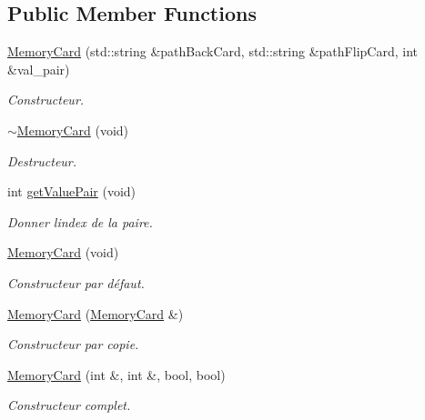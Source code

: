 \subsection*{Public Member Functions}
\begin{DoxyCompactItemize}
\item 
\hyperlink{class_memory_card_a64380fa5fec0bcd01a1907804989ca9c}{Memory\+Card} (std\+::string \&path\+Back\+Card, std\+::string \&path\+Flip\+Card, int \&val\+\_\+pair)
\begin{DoxyCompactList}\small\item\em Constructeur. \end{DoxyCompactList}\item 
\mbox{\label{class_memory_card_a3de3cef7b7af45dbf250435fb5004223}} 
\hyperlink{class_memory_card_a3de3cef7b7af45dbf250435fb5004223}{$\sim$\+Memory\+Card} (void)
\begin{DoxyCompactList}\small\item\em Destructeur. \end{DoxyCompactList}\item 
\mbox{\label{class_memory_card_a1d6b3ba288249cbd619700cc4f4fddd3}} 
int \hyperlink{class_memory_card_a1d6b3ba288249cbd619700cc4f4fddd3}{get\+Value\+Pair} (void)
\begin{DoxyCompactList}\small\item\em Donner l\textquotesingle{}index de la paire. \end{DoxyCompactList}\item 
\hyperlink{class_memory_card_a3d59bf204269e8b83a7eff862a838505}{Memory\+Card} (void)
\begin{DoxyCompactList}\small\item\em Constructeur par défaut. \end{DoxyCompactList}\item 
\hyperlink{class_memory_card_a682c2f65715e5e1bae9f0f04c361cddc}{Memory\+Card} (\hyperlink{class_memory_card}{Memory\+Card} \&)
\begin{DoxyCompactList}\small\item\em Constructeur par copie. \end{DoxyCompactList}\item 
\hyperlink{class_memory_card_ac34a1add168e88d58c5f864a35d4b136}{Memory\+Card} (int \&, int \&, bool, bool)
\begin{DoxyCompactList}\small\item\em Constructeur complet. \end{DoxyCompactList}\item 

\end{DoxyCompactItemize}

